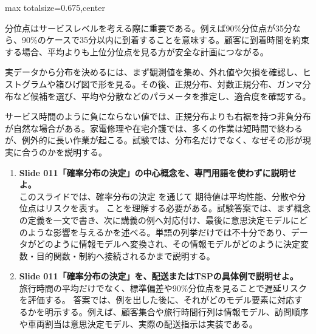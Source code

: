 \begin{adjustbox}{max totalsize={\textwidth}{0.675\textheight},center}
\begin{minipage}{\textwidth}
\begin{minipage}[t]{0.485\textwidth}
分位点はサービスレベルを考える際に重要である。例えば90\%分位点が35分なら、90\%のケースで35分以内に到着することを意味する。顧客に到着時間を約束する場合、平均よりも上位分位点を見る方が安全な計画につながる。\par
実データから分布を決めるには、まず観測値を集め、外れ値や欠損を確認し、ヒストグラムや箱ひげ図で形を見る。その後、正規分布、対数正規分布、ガンマ分布など候補を選び、平均や分散などのパラメータを推定し、適合度を確認する。\par
サービス時間のように負にならない値では、正規分布よりも右裾を持つ非負分布が自然な場合がある。家電修理や在宅介護では、多くの作業は短時間で終わるが、例外的に長い作業が起こる。試験では、分布名だけでなく、なぜその形が現実に合うのかを説明する。\par
{}
\begin{enumerate}
\item \textbf{Slide 011「確率分布の決定」の中心概念を、専門用語を使わずに説明せよ。}\\このスライドでは、確率分布の決定 を通じて 期待値は平均性能、分散や分位点はリスクを表す。 ことを理解する必要がある。試験答案では、まず概念の定義を一文で書き、次に講義の例へ対応付け、最後に意思決定モデルにどのような影響を与えるかを述べる。単語の列挙だけでは不十分であり、データがどのように情報モデルへ変換され、その情報モデルがどのように決定変数・目的関数・制約へ接続されるかまで説明する。
\item \textbf{Slide 011「確率分布の決定」を、配送またはTSPの具体例で説明せよ。}\\旅行時間の平均だけでなく、標準偏差や90\%分位点を見ることで遅延リスクを評価する。 答案では、例を出した後に、それがどのモデル要素に対応するかを明示する。例えば、顧客集合や旅行時間行列は情報モデル、訪問順序や車両割当は意思決定モデル、実際の配送指示は実装である。
\end{enumerate}
\end{minipage}
\end{minipage}
\end{adjustbox}

